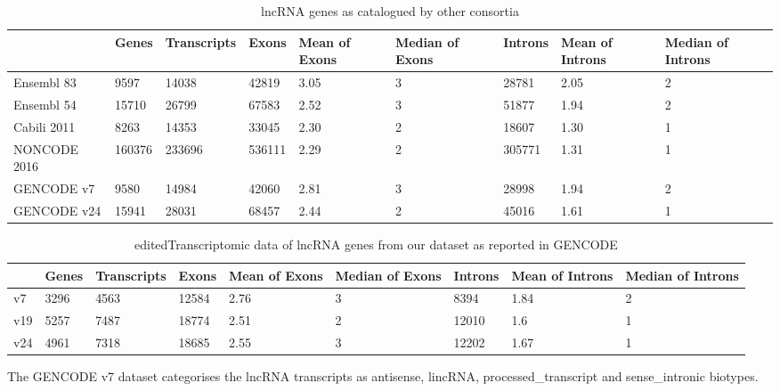\documentclass[ncrna,article,submit,moreauthors,pdftex,10pt,a4paper]{mdpi}
\newcommand{\update}[1]{\begingroup\color{blue}#1\endgroup}
\begin{document}
\begin{table}[ht]
\caption{lncRNA genes as catalogued by other consortia} 
\centering
{\tiny
\begin{tabular}[lrrrrrrrr]{p{}|p{}p{}p{}p{}
p{}p{}p{}p{}}
  \hline
 & Genes & Transcripts & Exons & Mean of Exons & Median of Exons & Introns & Mean of Introns & Median of Introns \\ 
   \hline
Ensembl 83 & 9597 & 14038 & 42819 & 3.05 &   3 & 28781 & 2.05 &   2 \\ 
  Ensembl 54 & 15710 & 26799 & 67583 & 2.52 &   3 & 51877 & 1.94 &   2 \\ 
  Cabili 2011 & 8263 & 14353 & 33045 & 2.30 &   2 & 18607 & 1.30 &   1 \\ 
  NONCODE 2016 & 160376 & 233696 & 536111 & 2.29 &   2 & 305771 & 1.31 &   1 \\ 
  GENCODE v7 & 9580 & 14984 & 42060 & 2.81 &   3 & 28998 & 1.94 &   2 \\ 
  GENCODE v24 & 15941 & 28031 & 68457 & 2.44 &   2 & 45016 & 1.61 &   1 \\ 
   \hline
\end{tabular}
}
\end{table}%


\begin{table}[ht]
\centering
{\tiny
\begin{tabular}[lrrrrrrrr]{p{}|p{}p{}p{}p{}
p{}p{}p{}p{}}
  \hline
 & Genes & Transcripts & Exons & Mean of Exons & Median of Exons & Introns & Mean of Introns & Median of Introns \\ 
   \hline
v7 & 3296 & 4563 & 12584 & 2.76 & 3 & 8394 & 1.84 & 2\\
  v19 & 5257 & 7487 & 18774 & 2.51 & 2 & 12010 & 1.6 & 1\\
  v24 & 4961 & 7318 & 18685 & 2.55 & 3 & 12202 & 1.67 & 1\\ 
   \hline
\end{tabular}
}
\caption{\update{edited}Transcriptomic data of lncRNA genes from our dataset as reported in GENCODE} 
\end{table}%



The GENCODE v7 dataset categorises the lncRNA transcripts as antisense, lincRNA, processed\_transcript and sense\_intronic biotypes. 
\end{document}
